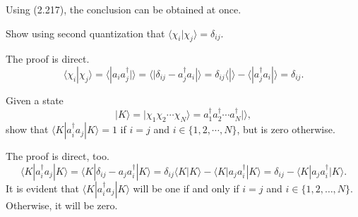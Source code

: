 \documentclass[a4paper]{book}
\newcounter{exercise}[chapter]
\newcounter{solution}[chapter]
\begin{document}
	\begin{solution}
	
	Using (2.217), the conclusion can be obtained at once.
	
	\end{solution}
	
	\begin{exercise}
	Show using second quantization that $\langle \chi_i | \chi_j \rangle = \delta_{ij}$.
	\end{exercise}
	
	\begin{solution}
	
	The proof is direct.
	\[
		\langle \chi_i | \chi_j \rangle = \langle | a_i a^\dagger_j | \rangle = \langle | \delta_{ij} - a^\dagger_j a_i | \rangle = \delta_{ij} \langle | \rangle - \langle | a^\dagger_j a_i | \rangle = \delta_{ij} .
	\]	
	
	\end{solution}
	
	\begin{exercise}
	Given a state 
	\[
		| K \rangle = | \chi_1 \chi_2 \cdots \chi_N \rangle = a^\dagger_1 a^\dagger_2 \cdots a^\dagger_N | \rangle,
	\]
	show that $\langle K | a^\dagger_i a_j | K \rangle = 1$ if $i=j$ and $i \in \{ 1 , 2 , \cdots, N \}$, but is zero otherwise.
	\end{exercise}
	
	\begin{solution}
	
	The proof is direct, too.	
	\[
		\langle K | a^\dagger_i a_j | K \rangle = \langle K | \delta_{ij} - a_j a^\dagger_i | K \rangle = \delta_{ij} \langle K | K \rangle - \langle K | a_j a^\dagger_i | K \rangle = \delta_{ij} - \langle K | a_j a^\dagger_i | K \rangle.
	\]	
	It is evident that $\langle K | a^\dagger_i a_j | K \rangle$ will be one if and only if $i=j$ and $i \in \{ 1, 2, \ldots, N \}$. Otherwise, it will be zero.
	
	\end{solution}
	
\end{document}
